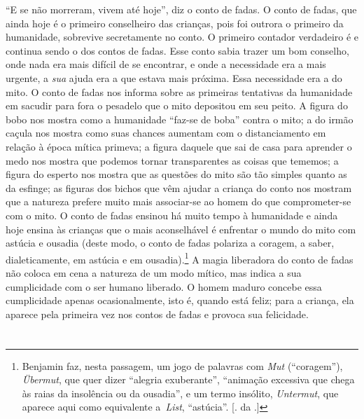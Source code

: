 ``E se não morreram, vivem até hoje'', diz o conto de fadas. O conto de
fadas, que ainda hoje é o primeiro conselheiro das crianças, pois foi
outrora o primeiro da humanidade, sobrevive secretamente no conto. O
primeiro contador verdadeiro é e continua sendo o dos contos de fadas.
Esse conto sabia trazer um bom conselho, onde nada era mais difícil de
se encontrar, e onde a necessidade era a mais urgente, a \emph{sua}
ajuda era a que estava mais próxima. Essa necessidade era a do mito. O
conto de fadas nos informa sobre as primeiras tentativas da humanidade
em sacudir para fora o pesadelo que o mito depositou em seu peito. A
figura do bobo nos mostra como a humanidade ``faz-se de boba'' contra o
mito; a do irmão caçula nos mostra como suas chances aumentam com o
distanciamento em relação à época mítica primeva; a figura daquele que
sai de casa para aprender o medo nos mostra que podemos tornar
transparentes as coisas que tememos; a figura do esperto nos mostra que
as questões do mito são tão simples quanto as da esfinge; as figuras dos
bichos que vêm ajudar a criança do conto nos mostram que a natureza
prefere muito mais associar-se ao homem do que comprometer-se com o
mito. O conto de fadas ensinou há muito tempo à humanidade e ainda hoje
ensina às crianças que o mais aconselhável é enfrentar o mundo do mito
com astúcia e ousadia (deste modo, o conto de fadas polariza a coragem,
a saber, dialeticamente, em astúcia e em ousadia).\footnote{Benjamin faz,
  nesta passagem, um jogo de palavras com \emph{Mut} (``coragem''),
  \emph{Übermut}, que quer dizer ``alegria exuberante'', ``animação
  excessiva que chega às raias da insolência ou da ousadia'', e um termo
  insólito, \emph{Untermut}, que aparece aqui como equivalente
  a~\emph{List}, ``astúcia''. [. da .]} A magia liberadora do
conto de fadas não coloca em cena a natureza de um modo mítico, mas
indica a sua cumplicidade com o ser humano liberado\label{supra5}. O homem maduro
concebe essa cumplicidade apenas ocasionalmente, isto é, quando está
feliz; para a criança, ela aparece pela primeira vez nos contos de fadas
e provoca sua felicidade.

\section{}

